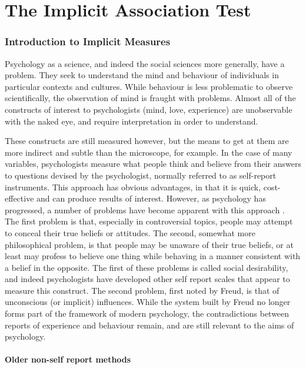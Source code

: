 \part{The Implicit Association Test}

\section{Introduction to Implicit Measures}

Psychology as a science, and indeed the social sciences more generally, have a problem. They seek to understand the mind and behaviour of individuals in particular contexts and cultures. While behaviour is less problematic to observe scientifically, the observation of mind is fraught with problems. Almost all of the constructs of interest to psychologists (mind, love, experience) are unobservable with the naked eye, and require interpretation in order to understand. 

These constructs are still measured however, but the means to get at them are more indirect and subtle than the microscope, for example. In the case of many variables, psychologists measure what people think and believe from their answers to questions devised by the psychologist, normally referred to as self-report instruments. This approach has obvious advantages, in that it is quick, cost-effective and can produce results of interest. However, as psychology has progressed, a number of problems have become apparent with this approach \cite{Nisbett1977}.  The first problem is that, especially in controversial topics, people may attempt to conceal their true beliefs or attitudes. The second, somewhat more philosophical problem, is that people may be unaware of their true beliefs, or at least may profess to believe one thing while behaving in a manner consistent with a belief in the opposite. The first of these problems is called social desirability, and indeed psychologists have developed other self report scales that appear to measure this construct. The second problem, first noted by Freud, is that of unconscious (or implicit) influences. While the system built by Freud no longer forms part of the framework of modern psychology, the contradictions between reports of experience and behaviour remain, and are still relevant to the aims of psychology. 

\subsection{Older non-self report methods}

